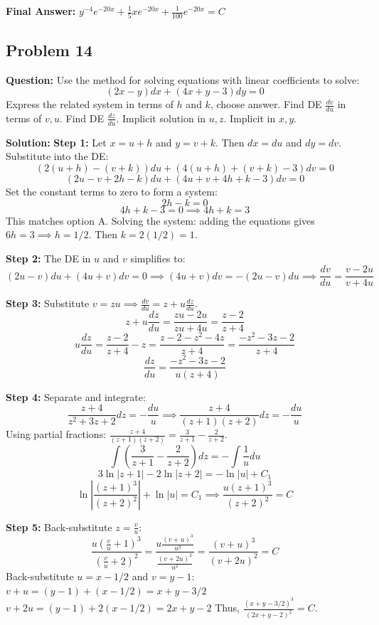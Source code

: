 \documentclass[11pt]{article}
\begin{document}
\textbf{Final Answer:} $y^{-4} e^{-20x} + \frac{1}{5}xe^{-20x} + \frac{1}{100}e^{-20x} = C$

\vspace{0.5cm}
\subsection*{Problem 14}
\textbf{Question:} Use the method for solving equations with linear coefficients to solve:
\[ (2x-y)dx + (4x+y-3)dy = 0 \]
Express the related system in terms of $h$ and $k$, choose answer. Find DE $\frac{dv}{du}$ in terms of $v, u$. Find DE $\frac{dz}{du}$. Implicit solution in $u, z$. Implicit in $x, y$.

\textbf{Solution:}
\textbf{Step 1:} Let $x = u+h$ and $y = v+k$. Then $dx = du$ and $dy = dv$. Substitute into the DE:
\[ (2(u+h) - (v+k))du + (4(u+h) + (v+k) - 3)dv = 0 \]
\[ (2u - v + 2h - k)du + (4u + v + 4h + k - 3)dv = 0 \]
Set the constant terms to zero to form a system:
\[ 2h - k = 0 \]
\[ 4h + k - 3 = 0 \implies 4h + k = 3 \]
This matches option A. Solving the system: adding the equations gives $6h = 3 \implies h = 1/2$. Then $k = 2(1/2) = 1$.

\textbf{Step 2:} The DE in $u$ and $v$ simplifies to:
\[ (2u - v)du + (4u + v)dv = 0 \implies (4u+v)dv = -(2u-v)du \implies \frac{dv}{du} = \frac{v-2u}{v+4u} \]

\textbf{Step 3:} Substitute $v = zu \implies \frac{dv}{du} = z + u\frac{dz}{du}$.
\[ z + u\frac{dz}{du} = \frac{zu - 2u}{zu + 4u} = \frac{z-2}{z+4} \]
\[ u\frac{dz}{du} = \frac{z-2}{z+4} - z = \frac{z-2 - z^2 - 4z}{z+4} = \frac{-z^2 - 3z - 2}{z+4} \]
\[ \frac{dz}{du} = \frac{-z^2 - 3z - 2}{u(z+4)} \]

\textbf{Step 4:} Separate and integrate:
\[ \frac{z+4}{z^2+3z+2} dz = -\frac{du}{u} \implies \frac{z+4}{(z+1)(z+2)} dz = -\frac{du}{u} \]
Using partial fractions: $\frac{z+4}{(z+1)(z+2)} = \frac{3}{z+1} - \frac{2}{z+2}$.
\[ \int \left(\frac{3}{z+1} - \frac{2}{z+2}\right) dz = -\int \frac{1}{u} du \]
\[ 3\ln|z+1| - 2\ln|z+2| = -\ln|u| + C_1 \]
\[ \ln\left|\frac{(z+1)^3}{(z+2)^2}\right| + \ln|u| = C_1 \implies \frac{u(z+1)^3}{(z+2)^2} = C \]

\textbf{Step 5:} Back-substitute $z = \frac{v}{u}$:
\[ \frac{u\left(\frac{v}{u}+1\right)^3}{\left(\frac{v}{u}+2\right)^2} = \frac{u \frac{(v+u)^3}{u^3}}{\frac{(v+2u)^2}{u^2}} = \frac{(v+u)^3}{(v+2u)^2} = C \]
Back-substitute $u = x - 1/2$ and $v = y - 1$:
$v+u = (y-1) + (x-1/2) = x + y - 3/2$
$v+2u = (y-1) + 2(x-1/2) = 2x + y - 2$
Thus, $\frac{(x+y-3/2)^3}{(2x+y-2)^2} = C$.
\end{document}
